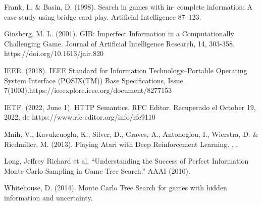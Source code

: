 \documentclass[11pt, oneside]{book}
\begin{document}
\begin{thebibliography}{111}
      Frank, I., \& Basin, D. (1998). Search in games with in-
      complete information: A case study using bridge card play. Artificial
      Intelligence 87–123.

      Ginsberg, M. L. (2001). GIB: Imperfect Information in
      a Computationally Challenging Game. Journal of Artificial Intelligence
      Research, 14, 303-358. https://doi.org/10.1613/jair.820

      IEEE. (2018). IEEE Standard for Information
      Technology--Portable Operating System Interface (POSIX(TM)) Base
      Specifications, Issue 7(1003).https://ieeexplore.ieee.org/document/8277153

      IETF. (2022, June 1). HTTP Semantics. RFC Editor.
      Recuperado el October 19, 2022, de https://www.rfc-editor.org/info/rfc9110


      Mnih, V., Kavukcuoglu, K., Silver, D., Graves, A.,
      Antonoglou, I., Wierstra, D. \& Riedmiller, M. (2013). Playing Atari with
      Deep Reinforcement Learning. , .

      Long, Jeffrey Richard et al. “Understanding the Success
      of Perfect Information Monte Carlo Sampling in Game Tree Search.” AAAI
      (2010).

      Whitehouse, D. (2014). Monte Carlo Tree Search for games with
      hidden information and uncertainty.





























\end{thebibliography}
\end{document}
